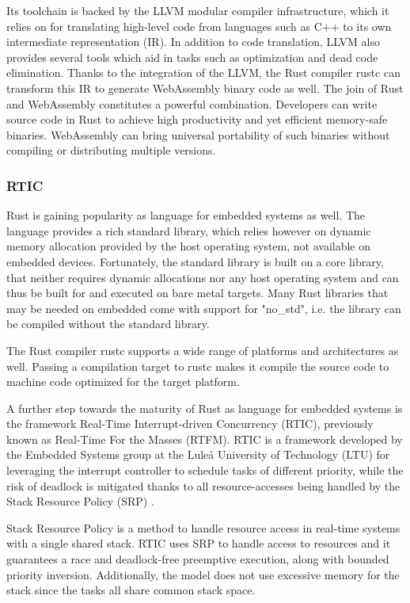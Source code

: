 \documentclass{ieeeaccess}
\begin{document}
Its toolchain is backed by the LLVM modular compiler infrastructure, which it relies on for translating high-level code from languages such as C++ to its own intermediate representation (IR). In addition to code translation, LLVM also provides several tools which aid in tasks such as optimization and dead code elimination. Thanks to the integration of the LLVM, the Rust compiler rustc can transform this IR to generate WebAssembly binary code as well. The join of Rust and WebAssembly constitutes a powerful combination. Developers can write source code in Rust to achieve high productivity and yet efficient memory-safe binaries. WebAssembly can bring universal portability of such binaries without compiling or distributing multiple versions. 

\subsubsection{RTIC}

Rust is gaining popularity as language for embedded systems as well. The language provides a rich standard library, which relies however on dynamic memory allocation provided by the host operating system, not available on embedded devices. Fortunately, the standard library is built on a core library, that neither requires dynamic allocations nor any host operating system and can thus be built for and executed on bare metal targets. Many Rust libraries that may be needed on embedded come with support for "no\_std", i.e. the library can be compiled without the standard library. 

The Rust compiler rustc supports a wide range of platforms and architectures as well. Passing a compilation target to rustc makes it compile the source code to machine code optimized for the target platform.

A further step towards the maturity of Rust as language for embedded systems is the framework Real-Time Interrupt-driven Concurrency (RTIC), previously known as Real-Time For the Masses (RTFM). RTIC is a framework developed by the Embedded Systems group at the Luleå University of Technology (LTU) for leveraging the interrupt controller to schedule tasks of different priority, while the risk of deadlock is mitigated thanks to all resource-accesses being handled by the Stack Resource Policy (SRP) \cite{stack-resource-policy}.

Stack Resource Policy is a method to handle resource access in real-time systems with a single shared stack. RTIC uses SRP to handle access to resources and it guarantees a race and deadlock-free preemptive execution, along with bounded priority inversion. Additionally, the model does not use excessive memory for the stack since the tasks all share common stack space.
\end{document}
